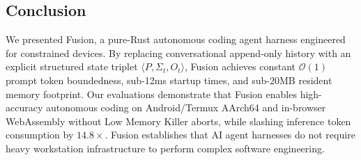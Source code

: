 \subsection{Conclusion}
We presented Fusion, a pure-Rust autonomous coding agent harness engineered for constrained devices. By replacing conversational append-only history with an explicit structured state triplet $\langle P, \Sigma_t, O_t \rangle$, Fusion achieves constant $\mathcal{O}(1)$ prompt token boundedness, sub-12ms startup times, and sub-20MB resident memory footprint. Our evaluations demonstrate that Fusion enables high-accuracy autonomous coding on Android/Termux AArch64 and in-browser WebAssembly without Low Memory Killer aborts, while slashing inference token consumption by $14.8\times$. Fusion establishes that AI agent harnesses do not require heavy workstation infrastructure to perform complex software engineering.
